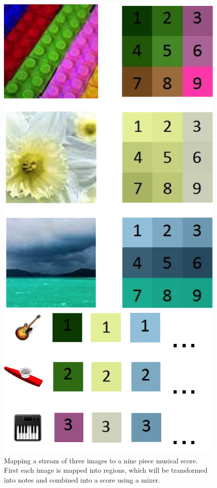 \documentclass[10pt, conference, compsocconf]{IEEEtran}
\begin{document}
\begin{figure}
  \centering
  \begin{minipage}[t]{.3\textwidth}
    \centering
    \includegraphics[width=.7\textwidth]{images-to-regions.png}
  \end{minipage}
  \begin{minipage}[t]{.1\textwidth}
    \raisebox{.8 in}{\Huge $\to$}
  \end{minipage}
  \begin{minipage}[t]{.4\textwidth}
    \centering
    \includegraphics[width=\textwidth]{parts-and-instruments.png}
  \end{minipage}
  \caption{Mapping a stream of three images to a nine piece musical
    score.  First each image is mapped into regions, which will be
    transformed into notes and combined into a score using a mixer.}
\end{figure}
  
\end{document}
